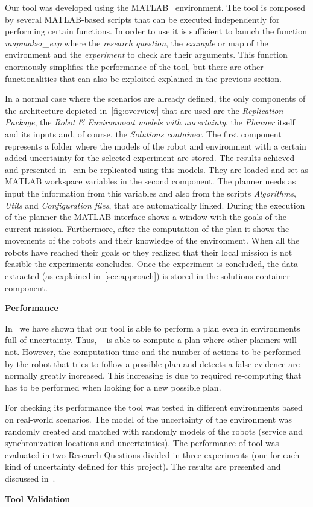 
Our tool was developed using the MATLAB~\cite{matlab} environment.
The tool is composed by several MATLAB-based scripts that can be executed independently for performing certain functions.
In order to use \toolName it is sufficient to launch the function \emph{mapmaker\_exp} where the \emph{research question}, the \emph{example} or map of the environment and the \emph{experiment} to check are their arguments.
This function enormously simplifies the performance of the tool, but there are other functionalities that can also be exploited explained in the previous section.

In a normal case where the scenarios are already defined, the only components of the architecture depicted in~\ref{fig:overview} that are used are the \emph{Replication Package}, the \emph{Robot \& Environment models with uncertainty}, the \emph{Planner} itself and its inputs and, of course, the \emph{Solutions container}.
The first component represents a folder where the models of the robot and environment with a certain added uncertainty for the selected experiment are stored.
The results achieved and presented in~\cite{mapmaker17} can be replicated using this models.
They are loaded and set as MATLAB workspace variables in the second component.
The planner needs as input the information from this variables and also from the scripts \emph{Algorithms}, \emph{Utils} and \emph{Configuration files}, that are automatically linked.
During the execution of the planner  the MATLAB interface shows a window with the goals of the current mission. 
Furthermore, after the computation of the plan it shows the movements of the robots and their knowledge of the environment.
When all the robots have reached their goals or they realized that their local mission is not feasible the experiments concludes.
Once the experiment is concluded, the data extracted (as explained in~\ref{sec:approach}) is stored in the solutions container component.

\textbf{Performance}

In~\cite{mapmaker17}  we have shown that our tool is able to perform a plan even in environments full of uncertainty.
Thus, \toolName~ is able to compute a plan where other planners will not.
However, the computation time and the number of actions to be performed by the robot that tries to follow a possible plan and detects a false evidence are normally greatly increased.
This increasing is due to required re-computing that has to be performed when looking for a new possible plan.

For checking its performance the tool was tested in different environments based on real-world scenarios.
The model of the uncertainty of the environment was randomly created and matched with randomly models of the robots (service and synchronization locations and uncertainties).
The performance of tool was evaluated in two Research Questions divided in three experiments (one for each kind of uncertainty defined for this project).
The results are presented and discussed in~\cite{mapmaker17}.

\textbf{Tool Validation}


